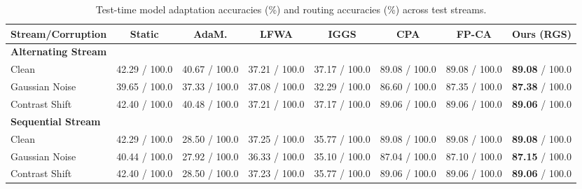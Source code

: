\documentclass{article}
\theoremstyle{plain}
\theoremstyle{definition}
\theoremstyle{remark}
\begin{document}
\begin{table}[t]
\caption{Test-time model adaptation accuracies (\%) and routing accuracies (\%) across test streams.}
\label{tab:main_results}
\vskip 0.15in
\begin{center}
\begin{footnotesize}
\begin{sc}
\setlength{\tabcolsep}{2.3pt}
\begin{tabular}{lccccccc}
\toprule
Stream/Corruption & Static & AdaM. & LFWA & IGGS & CPA & FP-CA & Ours (RGS) \\
\midrule
\textbf{Alternating Stream} \\
Clean & 42.29 / 100.0 & 40.67 / 100.0 & 37.21 / 100.0 & 37.17 / 100.0 & 89.08 / 100.0 & 89.08 / 100.0 & \textbf{89.08} / 100.0 \\
Gaussian Noise & 39.65 / 100.0 & 37.33 / 100.0 & 37.08 / 100.0 & 32.29 / 100.0 & 86.60 / 100.0 & 87.35 / 100.0 & \textbf{87.38} / 100.0 \\
Contrast Shift & 42.40 / 100.0 & 40.48 / 100.0 & 37.21 / 100.0 & 37.17 / 100.0 & 89.06 / 100.0 & 89.06 / 100.0 & \textbf{89.06} / 100.0 \\
\midrule
\textbf{Sequential Stream} \\
Clean & 42.29 / 100.0 & 28.50 / 100.0 & 37.25 / 100.0 & 35.77 / 100.0 & 89.08 / 100.0 & 89.08 / 100.0 & \textbf{89.08} / 100.0 \\
Gaussian Noise & 40.44 / 100.0 & 27.92 / 100.0 & 36.33 / 100.0 & 35.10 / 100.0 & 87.04 / 100.0 & 87.10 / 100.0 & \textbf{87.15} / 100.0 \\
Contrast Shift & 42.40 / 100.0 & 28.50 / 100.0 & 37.23 / 100.0 & 35.77 / 100.0 & 89.06 / 100.0 & 89.06 / 100.0 & \textbf{89.06} / 100.0 \\
\bottomrule
\end{tabular}
\end{sc}
\end{footnotesize}
\end{center}
\vskip -0.1in
\end{table}
\end{document}
